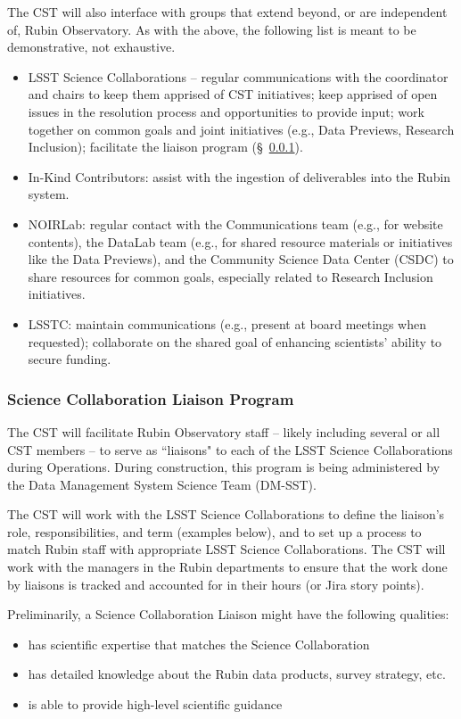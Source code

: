 \documentclass[DM,authoryear,toc]{lsstdoc}
\begin{document}
The CST will also interface with groups that extend beyond, or are independent of, Rubin Observatory.
As with the above, the following list is meant to be demonstrative, not exhaustive.
\begin{itemize}
\item LSST Science Collaborations -- regular communications with the coordinator and chairs to keep them apprised of CST initiatives; keep apprised of open issues in the resolution process and opportunities to provide input; work together on common goals and joint initiatives (e.g., Data Previews, Research Inclusion); facilitate the liaison program (\S~\ref{sssec:mod_interface_SCliaison}).
\item In-Kind Contributors: assist with the ingestion of deliverables into the Rubin system.
\item NOIRLab: regular contact with the Communications team (e.g., for website contents), the DataLab team (e.g., for shared resource materials or initiatives like the Data Previews), and the Community Science Data Center (CSDC) to share resources for common goals, especially related to Research Inclusion initiatives.
\item LSSTC: maintain communications (e.g., present at board meetings when requested); collaborate on the shared goal of enhancing scientists' ability to secure funding.
\end{itemize}


\subsubsection{Science Collaboration Liaison Program}\label{sssec:mod_interface_SCliaison}

The CST will facilitate Rubin Observatory staff -- likely including several or all CST members -- to serve as ``liaisons" to each of the LSST Science Collaborations during Operations. 
During construction, this program is being administered by the Data Management System Science Team (DM-SST).

The CST will work with the LSST Science Collaborations to define the liaison's role, responsibilities, and term (examples below), and to set up a process to match Rubin staff with appropriate LSST Science Collaborations.
The CST will work with the managers in the Rubin departments to ensure that the work done by liaisons is tracked and accounted for in their hours (or Jira story points). 

Preliminarily, a Science Collaboration Liaison might have the following qualities:
\begin{itemize}
\item has scientific expertise that matches the Science Collaboration
\item has detailed knowledge about the Rubin data products, survey strategy, etc. 
\item is able to provide high-level scientific guidance 
\end{itemize}
\end{document}

